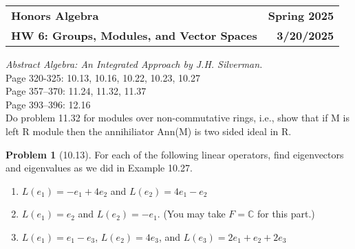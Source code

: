 \documentclass[12pt]{article}
\theoremstyle{definition}
\newtheorem{problem}{Problem}
\newcommand{\hwnum}{6}
\newcommand{\duedate}{3/20/2025}
\renewcommand{\title}{Groups, Modules, and Vector Spaces}
\begin{document}
\hspace{-10px}
\begin{tabular*}{\textwidth}{l @{\extracolsep{\fill}} r}
    \textbf{Honors Algebra} & \textbf{Spring 2025} \\
    \textbf{HW \hwnum : \title} &  \textbf{\duedate} \\
\end{tabular*}

\vspace{1cm}

\textit{Abstract Algebra: An Integrated Approach by J.H. Silverman.}\\
Page 320-325: 10.13, 10.16, 10.22, 10.23, 10.27\\
Page 357–370: 11.24, 11.32, 11.37\\
Page 393–396: 12.16\\
Do problem 11.32 for modules over non-commutative rings, i.e., show that 
if M is left R module then the annihiliator Ann(M) is two sided ideal in R.


\vspace{1cm}





\begin{problem}[10.13]
    For each of the following linear operators, find eigenvectors and eigenvalues as we did in Example 10.27. 
    \begin{enumerate}[label=(\alph*)]
        \item $L(e_1) = -e_1 + 4e_2$ and $L(e_2) = 4e_1 - e_2$
        \begin{solution}

        \end{solution}

        \item $L(e_1) = e_2$ and $L(e_2) = -e_1$. (You may take $F = \mathbb{C}$ for this part.)
        \begin{solution}

        \end{solution}

        \item $L(e_1) = e_1 - e_3$, $L(e_2) = 4e_3$, and $L(e_3) = 2e_1 + e_2 + 2e_3$
        \begin{solution}

        \end{solution}
    \end{enumerate}
\end{problem}
\end{document}

